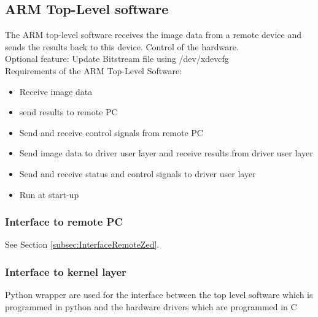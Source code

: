 \subsection{ARM Top-Level software}
The ARM top-level software receives the image data from a remote device and sends the results back to this device. Control of the hardware. \\
Optional feature: Update Bitstream file using /dev/xdevcfg \\
Requirements of the ARM Top-Level Software:
\begin{itemize} 
	\item Receive image data
	\item send results to remote PC
	\item Send and receive control signals from remote PC
	\item Send image data to driver user layer and receive results from driver user layer
	\item Send and receive status and control signals to driver user layer
	\item Run at start-up 
\end{itemize}

\subsubsection{Interface to remote PC}
See Section \ref{subsec:InterfaceRemoteZed}.  
\subsubsection{Interface to kernel layer}
Python wrapper are used for the interface between the top level software which is programmed in python and the hardware drivers which are programmed in C

